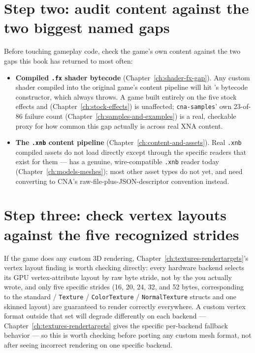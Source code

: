 \section{Step two: audit content against the two biggest named gaps}

Before touching gameplay code, check the game's own content against the two gaps this book
has returned to most often:

\begin{itemize}
  \item \textbf{Compiled \texttt{.fx} shader bytecode} (Chapter~\ref{ch:shader-fx-gap}).
        Any custom shader compiled into the original game's content pipeline will hit
        's bytecode constructor, which always throws. A game built entirely
        on the five stock effects and  (Chapter~\ref{ch:stock-effects})
        is unaffected; \texttt{cna-samples}' own 23-of-86 failure count
        (Chapter~\ref{ch:samples-and-examples}) is a real, checkable proxy for how common
        this gap actually is across real XNA content.
  \item \textbf{The \texttt{.xnb} content pipeline} (Chapter~\ref{ch:content-and-assets}).
        Real \texttt{.xnb} compiled assets do not load directly except through the specific
        readers that exist for them ---  has a genuine, wire-compatible
        \texttt{.xnb} reader today (Chapter~\ref{ch:models-meshes}); most other asset types do
        not yet, and need converting to CNA's raw-file-plus-JSON-descriptor convention
        instead.
\end{itemize}

\section{Step three: check vertex layouts against the five recognized strides}

If the game does any custom 3D rendering, Chapter~\ref{ch:textures-rendertargets}'s vertex
layout finding is worth checking directly: every hardware backend selects its GPU
vertex-attribute layout by raw byte stride, not by the  you
actually wrote, and only five specific strides (16, 20, 24, 32, and 52 bytes, corresponding to
the standard  / \texttt{Texture} / \texttt{ColorTexture} /
\texttt{NormalTexture} structs and one skinned layout) are guaranteed to render correctly
everywhere. A custom vertex format outside that set will degrade differently on each backend
--- Chapter~\ref{ch:textures-rendertargets} gives the specific per-backend fallback behavior
--- so this is worth checking before porting any custom mesh format, not after seeing
incorrect rendering on one specific backend.

